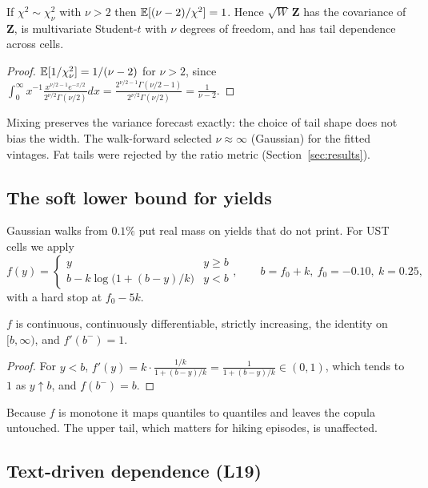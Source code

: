 \begin{lemma}\label{lem:tmix}
If $\chi^2\sim\chi^2_\nu$ with $\nu>2$ then $\mathbb{E}[(\nu-2)/\chi^2]=1$. Hence $\sqrt W\,\bm Z$ has the covariance of $\bm Z$, is multivariate Student-$t$ with
$\nu$ degrees of freedom, and has tail dependence across cells.
\end{lemma}
\begin{proof}
$\mathbb{E}[1/\chi^2_\nu]=1/(\nu-2)$ for $\nu>2$, since $\int_0^\infty x^{-1}\frac{x^{\nu/2-1}e^{-x/2}}{2^{\nu/2}\Gamma(\nu/2)}dx=\frac{2^{\nu/2-1}\Gamma(\nu/2-1)}{2^{\nu/2}\Gamma(\nu/2)}=\frac1{\nu-2}$.
\end{proof}
Mixing preserves the variance forecast exactly: the choice of tail shape does not bias the width. The walk-forward selected $\nu\approx\infty$
(Gaussian) for the fitted vintages. Fat tails were rejected by the ratio metric (Section~\ref{sec:results}).

\subsection{The soft lower bound for yields}

Gaussian walks from $0.1\%$ put real mass on yields that do not print. For UST cells we apply
\begin{equation}
  f(y)=\begin{cases} y & y\ge b\\ b-k\log\bigl(1+(b-y)/k\bigr) & y<b\end{cases},\qquad b=f_0+k,\ f_0=-0.10,\ k=0.25,
\end{equation}
with a hard stop at $f_0-5k$.

\begin{proposition}
$f$ is continuous, continuously differentiable, strictly increasing, the identity on $[b,\infty)$, and $f'(b^-)=1$.
\end{proposition}
\begin{proof}
For $y<b$, $f'(y)=k\cdot\frac{1/k}{1+(b-y)/k}=\frac{1}{1+(b-y)/k}\in(0,1)$, which tends to $1$ as $y\uparrow b$, and $f(b^-)=b$.
\end{proof}
Because $f$ is monotone it maps quantiles to quantiles and leaves the copula untouched. The upper tail, which matters for hiking episodes, is unaffected.

\subsection{Text-driven dependence (L19)}

